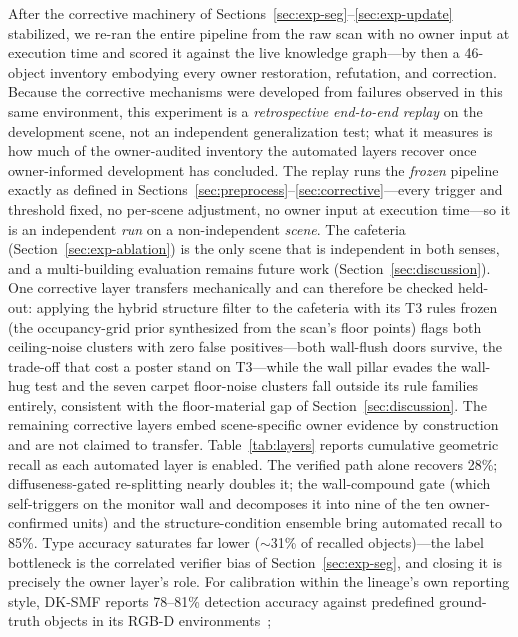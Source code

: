 \documentclass[electronics,article,accept,pdftex,moreauthors]{Definitions/mdpi}
\begin{document}
After the corrective machinery of Sections~\ref{sec:exp-seg}--\ref{sec:exp-update}
stabilized, we re-ran the entire pipeline from the raw scan with no owner
input at execution time and scored it against the live knowledge graph---by then a 46-object inventory embodying every owner restoration,
refutation, and correction. Because the corrective mechanisms were
developed from failures observed in this same environment, this
experiment is a \emph{retrospective end-to-end replay} on the
development scene, not an independent generalization test; what it
measures is how much of the owner-audited inventory the automated
layers recover once owner-informed development has concluded. The
replay runs the \emph{frozen} pipeline exactly as defined in
Sections~\ref{sec:preprocess}--\ref{sec:corrective}---every trigger and
threshold fixed, no per-scene adjustment, no owner input at execution
time---so it is an independent \emph{run} on a non-independent
\emph{scene}. The cafeteria (Section~\ref{sec:exp-ablation}) is the only
scene that is independent in both senses, and a multi-building
evaluation remains future work
(Section~\ref{sec:discussion}). One
corrective layer transfers mechanically and can therefore be checked
held-out: applying the hybrid structure filter to the cafeteria with
its T3 rules frozen (the occupancy-grid prior synthesized from the
scan's floor points) flags both ceiling-noise clusters with zero false
positives---both wall-flush doors survive, the trade-off that cost a
poster stand on T3---while the wall pillar evades the wall-hug test
and the seven carpet floor-noise clusters fall outside its rule
families entirely, consistent with the floor-material gap of
Section~\ref{sec:discussion}. The remaining corrective layers embed
scene-specific owner evidence by construction and are not claimed to
transfer. Table~\ref{tab:layers} reports cumulative geometric recall as
each automated layer is enabled. The verified path alone recovers 28\%;
diffuseness-gated re-splitting nearly doubles it; the wall-compound gate
(which self-triggers on the monitor wall and decomposes it into nine of
the ten owner-confirmed units) and the structure-condition ensemble bring
automated recall to 85\%. Type accuracy saturates far lower
($\sim$31\% of recalled objects)---the label bottleneck is the
correlated verifier bias of Section~\ref{sec:exp-seg}, and closing it is
precisely the owner layer's role. For calibration within the lineage's
own reporting style, DK-SMF reports 78--81\% detection accuracy against
predefined ground-truth objects in its RGB-D environments~\cite{joo2025dksmf};
\end{document}
